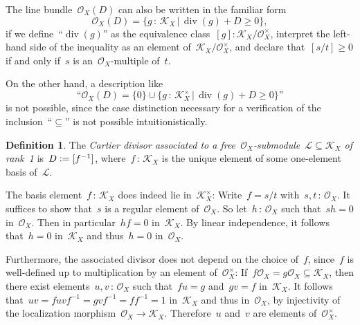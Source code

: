 \documentclass[10pt,reqno,a4paper]{amsbook}
\makeatletter
\theoremstyle{definition}
\newtheorem{defn}{Definition}[section]
\theoremstyle{plain}
\newtheorem{prop}[defn]{Proposition}
\theoremstyle{remark}
\renewcommand{\O}{\mathcal{O}}
\newcommand{\K}{\mathcal{K}}
\renewcommand{\L}{\mathcal{L}}
\newcommand{\?}{\,{:}\,}
\renewcommand{\_}{\mathpunct{.}\,}
\newcommand{\effective}{ef{}fective\xspace}
\newcommand{\defeq}{\vcentcolon=}
\renewenvironment{proof}[1][\proofname]{\par
  \pushQED{\qed}%
  \normalfont \topsep6\p@\@plus6\p@\relax
  \trivlist
  \item[\hskip\labelsep
        \itshape
    #1\@addpunct{.}]\ignorespaces
}{%
  \popQED\endtrivlist\@endpefalse
}
\makeatother
\begin{document}
The line bundle~$\O_X(D)$ can also be written in the familiar form
\[ \O_X(D) = \{ g \? \K_X \,|\, \operatorname{div}(g) + D \geq 0 \}, \]
if we define~``$\operatorname{div}(g)$'' as the equivalence class~$[g] :
\K_X/\O_X^\times$, interpret the left-hand side of the inequality as an element
of~$\K_X/\O_X^\times$, and declare that~$[s/t] \geq 0$ if and only if~$s$ is
an~$\O_X$-multiple of~$t$.

On the other hand, a description like
\[ \text{``$\O_X(D) = \{ 0 \} \cup \{ g \? \K_X^\times \,|\,
  \operatorname{div}(g) + D \geq 0 \}$''} \]
is not possible, since the case distinction necessary for a verification of the
inclusion~``$\subseteq$'' is not possible intuitionistically.


\begin{defn}The \emph{Cartier divisor associated to a free~$\O_X$-submodule~$\L \subseteq
\K_X$ of rank~1} is~$D \defeq [f^{-1}]$, where~$f\?\K_X$ is the unique element of
some one-element basis of~$\L$.\end{defn}

The basis element~$f\?\K_X$ does indeed lie in~$\K_X^\times$: Write~$f
= s/t$ with~$s,t \? \O_X$. It suffices to show that~$s$ is a regular element
of~$\O_X$. So let~$h\?\O_X$ such that~$sh = 0$ in~$\O_X$. Then in
particular~$hf = 0$ in~$\K_X$. By linear independence, it follows that~$h = 0$
in~$\K_X$ and thus~$h = 0$ in~$\O_X$.

Furthermore, the associated divisor does not depend on the choice of~$f$,
since~$f$ is well-defined up to multiplication by an element of~$\O_X^\times$: If~$f
\O_X = g \O_X \subseteq \K_X$, then there exist elements~$u,v\?\O_X$ such that~$fu = g$
and~$gv = f$ in~$\K_X$. It follows that~$uv = fuvf^{-1} = gvf^{-1} = ff^{-1} =
1$ in~$\K_X$ and thus in~$\O_X$, by injectivity of the localization morphism~$\O_X \to
\K_X$. Therefore~$u$ and~$v$ are elements of~$\O_X^\times$.
\end{document}
